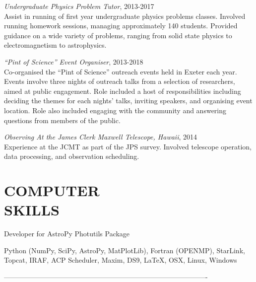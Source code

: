 \documentclass[letter, margin, 10pt]{res} %
\begin{document}
\begin{resume}
{\sl Undergraduate Physics Problem Tutor}, 2013-2017\\
Assist in running of first year undergraduate physics problems classes. Involved running homework sessions, managing approximately 140 students. Provided guidance on a wide variety of problems, ranging from solid state physics to electromagnetism to astrophysics. 

{\sl ``Pint of Science'' Event Organiser}, 2013-2018\\
Co-organised the ``Pint of Science'' outreach events held in Exeter each year. Events involve three nights of outreach talks from a selection of researchers, aimed at public engagement. Role included a host of responsibilities including deciding the themes for each nights' talks, inviting speakers, and organising event location. Role also included engaging with the community and answering questions from members of the public.

{\sl Observing At the James Clerk Maxwell Telescope, Hawaii}, 2014\\
Experience at the JCMT as part of the JPS survey. Involved telescope operation, data processing, and observation scheduling.


 

\section{COMPUTER \\ SKILLS}

Developer for AstroPy Photutils Package

Python (NumPy, SciPy, AstroPy, MatPlotLib), Fortran (OPENMP), StarLink, Topcat, IRAF, ACP Scheduler, Maxim, DS9, \LaTeX, OSX, Linux, Windows






 
----------------------------------------------------------------------------------------

\end{resume}
\end{document}
